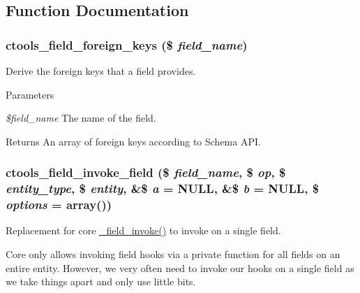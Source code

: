 \subsection{Function Documentation}
\hypertarget{fields_8inc_a714c68e6faaf2f4918d726fb580e920e}{
\subsubsection[{ctools\_\-field\_\-foreign\_\-keys}]{\setlength{\rightskip}{0pt plus 5cm}ctools\_\-field\_\-foreign\_\-keys (\$ {\em field\_\-name})}}
\label{fields_8inc_a714c68e6faaf2f4918d726fb580e920e}
Derive the foreign keys that a field provides.


\begin{DoxyParams}{Parameters}
\item[{\em \$field\_\-name}]The name of the field.\end{DoxyParams}
\begin{DoxyReturn}{Returns}
An array of foreign keys according to Schema API. 
\end{DoxyReturn}
\hypertarget{fields_8inc_a109d8f80825dc8d999859e0d580ca8e5}{
\subsubsection[{ctools\_\-field\_\-invoke\_\-field}]{\setlength{\rightskip}{0pt plus 5cm}ctools\_\-field\_\-invoke\_\-field (\$ {\em field\_\-name}, \/  \$ {\em op}, \/  \$ {\em entity\_\-type}, \/  \$ {\em entity}, \/  \&\$ {\em a} = {\ttfamily NULL}, \/  \&\$ {\em b} = {\ttfamily NULL}, \/  \$ {\em options} = {\ttfamily array()})}}
\label{fields_8inc_a109d8f80825dc8d999859e0d580ca8e5}
Replacement for core \hyperlink{group__field__attach_ga65f891a5eea6513f8505f5cfc5894896}{\_\-field\_\-invoke()} to invoke on a single field.

Core only allows invoking field hooks via a private function for all fields on an entire entity. However, we very often need to invoke our hooks on a single field as we take things apart and only use little bits.


